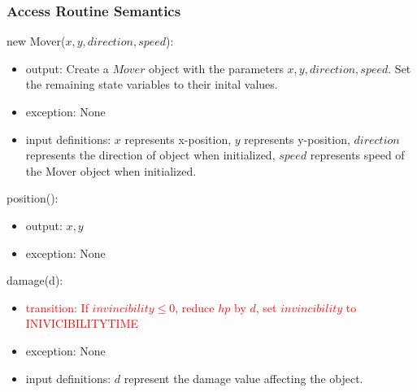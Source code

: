 \documentclass[12pt]{article}
\newcommand{\Implies}{\Rightarrow}
\begin{document}
\subsubsection*{Access Routine Semantics}

new Mover($x,y,direction,speed$):
\begin{itemize}
    \item output: Create a $Mover$ object with the parameters $x, y, direction, speed$. Set the remaining state variables to their inital values.
    \item exception: None
    \item input definitions: $x$ represents x-position, $y$ represents y-position, $direction$ represents the direction of object when initialized, $speed$ represents speed of the Mover object when initialized.
\end{itemize}

\noindent position():
\begin{itemize}
    \item output: $x, y$
    \item exception: None
\end{itemize}

\noindent damage(d):
\begin{itemize}
    \item \textcolor{red}{transition: If $invincibility \leq 0$, reduce $hp$ by $d$, set $invincibility$ to INIVICIBILITYTIME}
    \item exception: None
    \item input definitions: $d$ represent the damage value affecting the object. 
\end{itemize}
\end{document}

